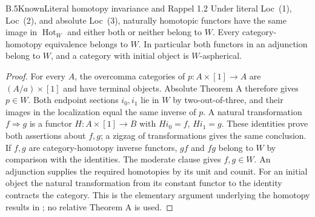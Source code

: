 \begin{claim}{B.5}{Known}{Literal homotopy invariance and Rappel 1.2}
Under literal Loc~(1), Loc~(2), and absolute Loc~(3), naturally homotopic
functors have the same image in $\operatorname{Hot}_W$ and either both or
neither belong to $W$. Every category-homotopy equivalence belongs to
$W$. In particular both functors in an adjunction belong to $W$, and a
category with initial object is $W$-aspherical.
\end{claim}
\begin{proof}
For every $A$, the overcomma categories of
$p:A\times[1]\to A$ are $(A/a)\times[1]$ and have terminal objects.
Absolute Theorem A therefore gives $p\in W$. Both endpoint sections
$i_0,i_1$ lie in $W$ by two-out-of-three, and their images in the
localization equal the same inverse of $p$. A natural transformation
$f\Rightarrow g$ is a functor $H:A\times[1]\to B$ with
$Hi_0=f$, $Hi_1=g$. These identities prove both assertions about $f,g$;
a zigzag of transformations gives the same conclusion.
If $f,g$ are category-homotopy inverse functors, $gf$ and $fg$ belong
to $W$ by comparison with the identities. The moderate clause gives
$f,g\in W$. An adjunction supplies the required homotopies by its unit
and counit. For an initial object the natural transformation from its
constant functor to the identity contracts the category.
This is the elementary argument underlying the homotopy results in
\citet[\S1.1]{RESMalts2020}; no relative Theorem A is used.
\end{proof}

